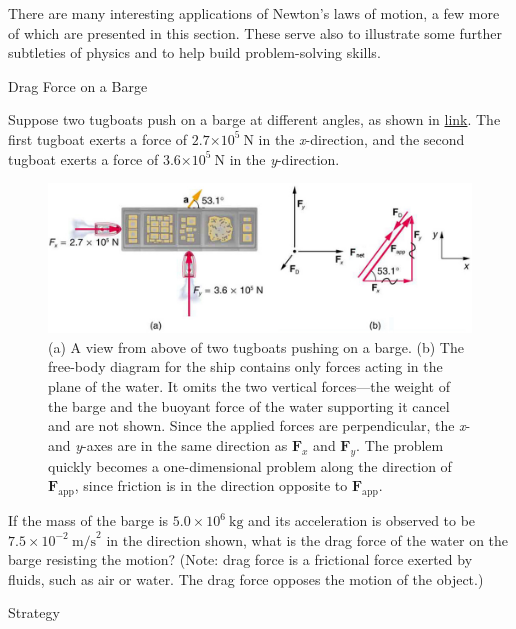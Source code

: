 \documentclass[
]{book}
\newenvironment{tinysection}{}{}
\begin{document}
There are many interesting applications of Newton's laws of motion, a
few more of which are presented in this section. These serve also to
illustrate some further subtleties of physics and to help build
problem-solving skills.

\hypertarget{fs-id2383966}{}
Drag Force on a Barge

Suppose two tugboats push on a barge at different angles, as shown in
\protect\hyperlink{import-auto-id1221020}{link}. The first
tugboat exerts a force of \({2.7{\times \text{10}^{5}}\ \text{N}}{}\) in
the \emph{x}-direction, and the second tugboat exerts a force of
\({3.6{\times \text{10}^{5}}\ \text{N}}{}\) in the \emph{y}-direction.

\begin{figure}
\hypertarget{import-auto-id1221020}{%
\centering
\includegraphics{images/Figure_04_07_01.jpg}
\caption{(a) A view from above of two tugboats pushing on a barge. (b) The
free-body diagram for the ship contains only forces acting in the plane
of the water. It omits the two vertical forces---the weight of the barge
and the buoyant force of the water supporting it cancel and are not
shown. Since the applied forces are perpendicular, the \emph{x}- and \emph{y}-axes
are in the same direction as \(\textbf{F}_{x}{}\) and \(\textbf{F}_{y}{}\).
The problem quickly becomes a one-dimensional problem along the
direction of \(\textbf{F}_{\text{app}}{}\), since friction is in the
direction opposite to
\(\textbf{F}_{\text{app}}{}\).}\label{import-auto-id1221020}
}
\end{figure}

If the mass of the barge is \({{5.0 \times \text{10}^{6}}\ \text{kg}}{}\)
and its acceleration is observed to be
\({7\text{.}{\text{5} \times \text{10}^{- 2}}\ \text{m/s}^{2}}{}\) in the
direction shown, what is the drag force of the water on the barge
resisting the motion? (Note: drag force is a frictional force exerted by
fluids, such as air or water. The drag force opposes the motion of the
object.)

\begin{tinysection}

{Strategy}

\end{tinysection}
\end{document}
